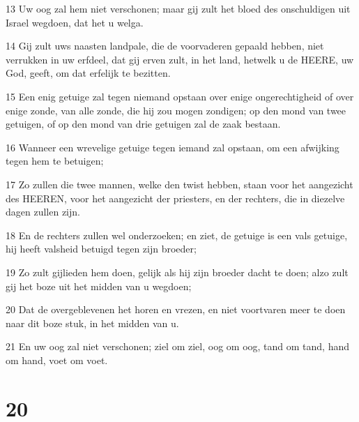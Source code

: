 \par 13 Uw oog zal hem niet verschonen; maar gij zult het bloed des onschuldigen uit Israel wegdoen, dat het u welga.
\par 14 Gij zult uws naasten landpale, die de voorvaderen gepaald hebben, niet verrukken in uw erfdeel, dat gij erven zult, in het land, hetwelk u de HEERE, uw God, geeft, om dat erfelijk te bezitten.
\par 15 Een enig getuige zal tegen niemand opstaan over enige ongerechtigheid of over enige zonde, van alle zonde, die hij zou mogen zondigen; op den mond van twee getuigen, of op den mond van drie getuigen zal de zaak bestaan.
\par 16 Wanneer een wrevelige getuige tegen iemand zal opstaan, om een afwijking tegen hem te betuigen;
\par 17 Zo zullen die twee mannen, welke den twist hebben, staan voor het aangezicht des HEEREN, voor het aangezicht der priesters, en der rechters, die in diezelve dagen zullen zijn.
\par 18 En de rechters zullen wel onderzoeken; en ziet, de getuige is een vals getuige, hij heeft valsheid betuigd tegen zijn broeder;
\par 19 Zo zult gijlieden hem doen, gelijk als hij zijn broeder dacht te doen; alzo zult gij het boze uit het midden van u wegdoen;
\par 20 Dat de overgeblevenen het horen en vrezen, en niet voortvaren meer te doen naar dit boze stuk, in het midden van u.
\par 21 En uw oog zal niet verschonen; ziel om ziel, oog om oog, tand om tand, hand om hand, voet om voet.

\chapter{20}

